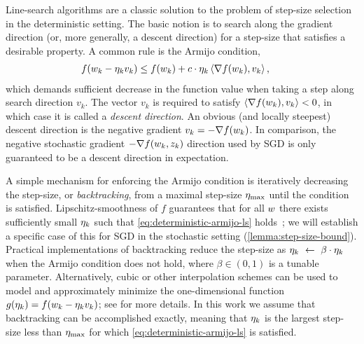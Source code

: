 Line-search algorithms are a classic solution to the problem of step-size selection in the deterministic setting.
The basic notion is to search along the gradient direction (or, more generally, a descent direction) for a step-size that satisfies a desirable property.
A common rule is the Armijo condition, 
 \begin{align}
     f(w_k - \eta_k v_k) &\leq f(w_k) + c \cdot \eta_k \left\langle\nabla f(w_k), v_k\right\rangle,~\label{eq:deterministic-armijo-ls}
\end{align}
which demands sufficient decrease in the function value when taking a step along search direction \( v_k \).
The vector \( v_k \) is required to satisfy \( \left\langle\nabla f(w_k), v_k\right\rangle < 0 \), in which case it is called a \emph{descent direction}.
An obvious (and locally steepest) descent direction is the negative gradient \( v_k = - \nabla f(w_k) \). 
In comparison, the negative stochastic gradient \( - \nabla f(w_k, z_{k}) \) direction used by \ac{SGD} is only guaranteed to be a descent direction in expectation.


A simple mechanism for enforcing the Armijo condition is iteratively decreasing the step-size, or \emph{backtracking}, from a maximal step-size \( \eta_{\text{max}} \) until the condition is satisfied.
Lipschitz-smoothness of \( f \) guarantees that for all \( w \) there exists sufficiently small \( \eta_k \) such that \autoref{eq:deterministic-armijo-ls} holds~\citep{nocedal1999numerical}; we will establish a specific case of this for \ac{SGD} in the stochastic setting (\autoref{lemma:step-size-bound}). 
Practical implementations of backtracking reduce the step-size as \( \eta_k~\gets~\beta \cdot \eta_k \) when the Armijo condition does not hold, where \( \beta \in (0,1) \) is a tunable parameter. 
Alternatively, cubic or other interpolation schemes can be used to model and approximately minimize the one-dimensional function \( g(\eta_k) = f(w_k - \eta_k v_k) \); see \citet{nocedal1999numerical} for more details.
In this work we assume that backtracking can be accomplished exactly, meaning that \( \eta_k \) is the largest step-size less than \( \eta_{\text{max}} \) for which \autoref{eq:deterministic-armijo-ls} is satisfied.

